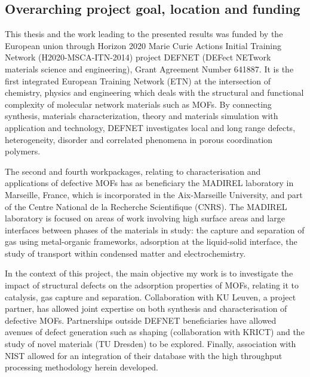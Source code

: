 \subsection*{Overarching project goal, location and funding}

This thesis and the work leading to the presented results 
was funded by the European union through Horizon 2020 Marie Curie
Actions Initial Training Network (H2020-MSCA-ITN-2014)
project DEFNET (DEFect NETwork materials science and engineering), 
Grant Agreement Number 641887. It is the first integrated 
European Training Network (ETN) at the intersection
of chemistry, physics and engineering which deals with the structural and
functional complexity of molecular network materials such as \glspl{MOF}. 
By connecting synthesis, materials characterization,
theory and materials simulation with application and technology, 
DEFNET investigates local and long range defects, heterogeneity, 
disorder and correlated phenomena in porous coordination polymers.

The second and fourth workpackages, relating to characterisation and
applications of defective \glspl{MOF} has as beneficiary the MADIREL 
laboratory in Marseille, France, which is incorporated in the
Aix-Marseille University, and part of the Centre
National de la Recherche Scientifique (CNRS). The MADIREL 
laboratory is focused on areas of work involving high surface
areas and large interfaces between phases of the materials in 
study: the capture and separation of gas using metal-organic 
frameworks, adsorption at the liquid-solid interface,
the study of transport within condensed matter and electrochemistry.

In the context of this project, the main objective my work is to
investigate the impact of structural defects on the adsorption
properties of \glspl{MOF}, relating it to catalysis, gas capture
and separation. Collaboration with KU Leuven, a project partner,
has allowed joint expertise on both synthesis and characterisation
of defective \glspl{MOF}. Partnerships outside DEFNET beneficiaries have
allowed avenues of defect generation such as shaping
(collaboration with KRICT) and the study of novel materials 
(TU Dresden) to be explored. Finally, association with NIST allowed 
for an integration of their database with the high throughput 
processing methodology herein developed.

\pagebreak

\let\oldaddcontentsline\addcontentsline%
\renewcommand{\addcontentsline}[3]{}%


\let\addcontentsline\oldaddcontentsline%